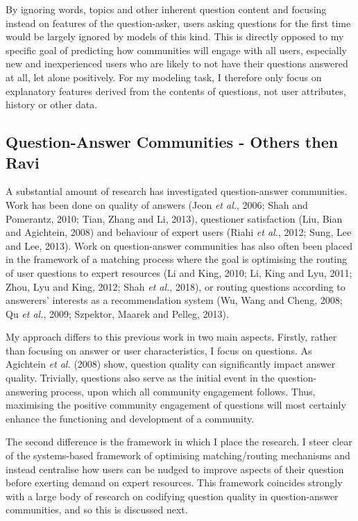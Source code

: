\documentclass[11pt,preprint, authoryear]{article}
\numberwithin{equation}{section}
\numberwithin{figure}{section}
\begin{document}
By ignoring words, topics and other inherent question content and
focusing instead on features of the question-asker, users asking
questions for the first time would be largely ignored by models of this
kind. This is directly opposed to my specific goal of predicting how
communities will engage with all users, especially new and inexperienced
users who are likely to not have their questions answered at all, let
alone positively. For my modeling task, I therefore only focus on
explanatory features derived from the contents of questions, not user
attributes, history or other data.

\subsection{Question-Answer Communities - Others then
Ravi}\label{question-answer-communities---others-then-ravi}

A substantial amount of research has investigated question-answer
communities. Work has been done on quality of answers (Jeon \emph{et
al.}, 2006; Shah and Pomerantz, 2010; Tian, Zhang and Li, 2013),
questioner satisfaction (Liu, Bian and Agichtein, 2008) and behaviour of
expert users (Riahi \emph{et al.}, 2012; Sung, Lee and Lee, 2013). Work
on question-answer communities has also often been placed in the
framework of a matching process where the goal is optimising the routing
of user questions to expert resources (Li and King, 2010; Li, King and
Lyu, 2011; Zhou, Lyu and King, 2012; Shah \emph{et al.}, 2018), or
routing questions according to answerers' interests as a recommendation
system (Wu, Wang and Cheng, 2008; Qu \emph{et al.}, 2009; Szpektor,
Maarek and Pelleg, 2013).

My approach differs to this previous work in two main aspects. Firstly,
rather than focusing on answer or user characteristics, I focus on
questions. As Agichtein \emph{et al.} (2008) show, question quality can
significantly impact answer quality. Trivially, questions also serve as
the initial event in the question-answering process, upon which all
community engagement follows. Thus, maximising the positive community
engagement of questions will most certainly enhance the functioning and
development of a community.

The second difference is the framework in which I place the research. I
steer clear of the systems-based framework of optimising
matching/routing mechanisms and instead centralise how users can be
nudged to improve aspects of their question before exerting demand on
expert resources. This framework coincides strongly with a large body of
research on codifying question quality in question-answer communities,
and so this is discussed next.
\end{document}
